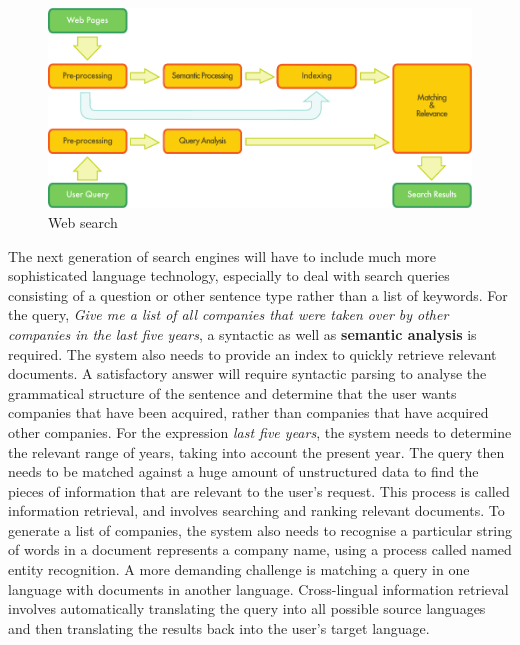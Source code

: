 \begin{multicols}{2}
\begin{figure}[t]
  \center
  \includegraphics[width=\textwidth]{../_media/english/web_search_architecture}
  \caption{Web search}
  \label{fig:websearcharch_en}
 \end{figure}


The next generation of search engines will have to include much more sophisticated language technology, especially to deal with search queries consisting of a question or other sentence type rather than a list of keywords. For the query, \emph{Give me a list of all companies that were taken over by other companies in the last five years}, a syntactic as well as \textbf{semantic analysis} is required. The system also needs to provide an index to quickly retrieve relevant documents. A satisfactory answer will require syntactic parsing to analyse the grammatical structure of the sentence and determine that the user wants companies that have been acquired, rather than companies that have acquired other companies. For the expression \emph{last five years}, the system needs to determine the relevant range of years, taking into account the present year. The query then needs to be matched against a huge amount of unstructured data to find the pieces of information that are relevant to the user’s request. This process is called information retrieval, and involves searching and ranking relevant documents. To generate a list of companies, the system also needs to recognise a particular string of words in a document represents a company name, using a process called named entity recognition. A more demanding challenge is matching a query in one language with documents in another language. Cross-lingual information retrieval involves automatically translating the query into all possible source languages and then translating the results back into the user’s target language.


\end{multicols}
